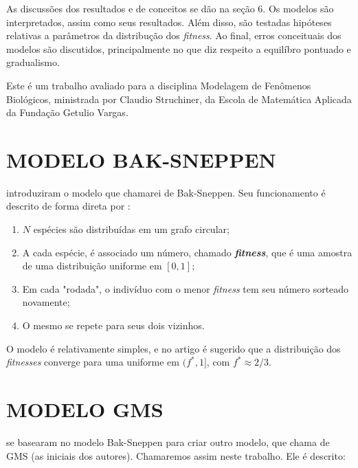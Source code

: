 \documentclass[10pt,brazil,english]{article}
\begin{document}
        As discussões dos resultados e de conceitos se dão na seção 6.
        Os modelos são interpretados, assim como seus resultados.
        Além disso, são testadas hipóteses relativas a parâmetros da distribução dos \textit{fitness}.
        Ao final, erros conceituais dos modelos são discutidos, principalmente no que diz respeito a equilíbro pontuado e gradualismo.

        Este é um trabalho avaliado para a disciplina Modelagem de Fenômenos Biológicos, ministrada por Claudio Struchiner, da Escola de Matemática Aplicada da Fundação Getulio Vargas.
    
    \section{MODELO BAK-SNEPPEN}

         introduziram o modelo que chamarei de Bak-Sneppen.
        Seu funcionamento é descrito de forma direta por :

        \renewcommand{\theenumi}{\roman{enumi}} 
        \begin{enumerate}
            \item $N$ espécies são distribuídas em um grafo circular;
            \item A cada espécie, é associado um número, chamado \textit{\textbf{fitness}}, que é uma amostra de uma distribuição uniforme em $[0, 1]$;
            \item Em cada "rodada", o indivíduo com o menor \textit{fitness} tem seu número sorteado novamente;
            \item O mesmo se repete para seus dois vizinhos.
        \end{enumerate}

        O modelo é relativamente simples, e no artigo é sugerido que a distribuição dos \textit{fitnesses} converge para uma uniforme em $(f^*, 1]$, com $f^* \approx 2/3$.

    \section{MODELO GMS}

         se basearam no modelo Bak-Sneppen para criar outro modelo, que  chama de GMS (as iniciais dos autores). Chamaremos assim neste trabalho. Ele é descrito:
\end{document}
